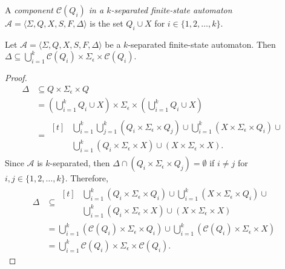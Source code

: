 \begin{definition}
  A \emph{component $\mathcal{C}(Q_i)$ in a $k$-separated finite-state automaton}
  $\mathcal{A} = \langle \Sigma, Q, X, S, F, \Delta \rangle$ is the set $Q_i \cup X$
  for $i \in \{ 1, 2, \ldots, k \}$.
\end{definition}

\begin{proposition}\label{prop:small_delta}
  Let $\mathcal{A} = \langle \Sigma, Q, X, S, F, \Delta \rangle$ be a
  $k$-separated finite-state automaton. Then $\Delta \subseteq \bigcup_{i=1}^k
  \mathcal{C}(Q_i) \times \Sigma_\epsilon \times \mathcal{C}(Q_i)$.
\end{proposition}

\begin{proof}
  \begin{align*}
    \Delta                        & \subseteq Q \times \Sigma_\epsilon \times Q                   \\
                                  & = (\bigcup_{i=1}^k{Q_i} \cup X) \times \Sigma_\epsilon \times
    (\bigcup_{i=1}^k{Q_i} \cup X) &                                                               \\
                                  & = \begin{aligned}[t]
       & \bigcup_{i=1}^k \bigcup_{j=1}^k (Q_i \times \Sigma_\epsilon
      \times Q_j) \cup \bigcup_{i=1}^k (X \times \Sigma_\epsilon
      \times Q_i) \cup                                               \\
       & \bigcup_{i=1}^k (Q_i \times \Sigma_\epsilon \times X) \cup
      (X \times \Sigma_\epsilon \times X).
    \end{aligned}
  \end{align*}
  Since $\mathcal{A}$ is $k$-separated, then $\Delta \cap (Q_i \times
    \Sigma_\epsilon \times Q_j) = \emptyset$ if $i \neq j$ for $i, j \in
    \{ 1, 2, \ldots, k \}$. Therefore,
  \begin{align*}
    \Delta & \subseteq \begin{aligned}[t]
       & \bigcup_{i=1}^k (Q_i \times \Sigma_\epsilon \times Q_i)
      \cup \bigcup_{i=1}^k (X \times \Sigma_\epsilon \times Q_i)
      \cup                                                          \\
       & \bigcup_{i=1}^k (Q_i \times \Sigma_\epsilon \times X) \cup
      (X \times \Sigma_\epsilon \times X)
    \end{aligned}                                & \\
    & = \bigcup_{i=1}^k (\mathcal{C}(Q_i) \times \Sigma_\epsilon \times Q_i)
    \cup \bigcup_{i=1}^k (\mathcal{C}(Q_i) \times \Sigma_\epsilon \times X)\\
    & = \bigcup_{i=1}^k \mathcal{C}(Q_i) \times \Sigma_\epsilon \times
    \mathcal{C}(Q_i).
  \end{align*}
\end{proof}

